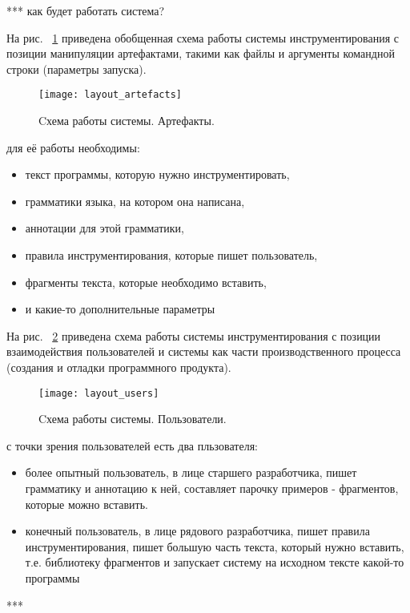 ***
как будет работать система?

На рис. ~\ref{fig:layout_artefacts} приведена обобщенная схема работы системы инструментирования с позиции манипуляции артефактами, такими как файлы и аргументы командной строки (параметры запуска).

\begin{figure}[!h]
	\centering
	\texttt{[image: layout\_artefacts]}
	\caption{Cхема работы системы. Артефакты.}
	\label{fig:layout_artefacts}
\end{figure}

для её работы необходимы:
\begin{itemize}
  \item текст программы, которую нужно инструментировать,
  \item грамматики языка, на котором она написана,
  \item аннотации для этой грамматики,
  \item правила инструментирования, которые пишет пользователь,
  \item фрагменты текста, которые необходимо вставить,
  \item и какие-то дополнительные параметры
\end{itemize}

На рис. ~\ref{fig:layout_users} приведена схема работы системы инструментирования с позиции взаимодействия пользователей и системы как части производственного процесса (создания и отладки программного продукта).

\begin{figure}[!h]
	\centering
	\texttt{[image: layout\_users]}
	\caption{Cхема работы системы. Пользователи.}
	\label{fig:layout_users}
\end{figure}

с точки зрения пользователей есть два пльзователя:
\begin{itemize}
  \item более опытный пользователь, в лице старшего разработчика, пишет грамматику и аннотацию к ней, составляет парочку примеров - фрагментов, которые можно вставить.

  \item конечный пользователь, в лице рядового разработчика, пишет правила инструментирования, пишет большую часть текста, который нужно вставить, т.е. библиотеку фрагментов и запускает систему на исходном тексте какой-то программы
\end{itemize}

***

